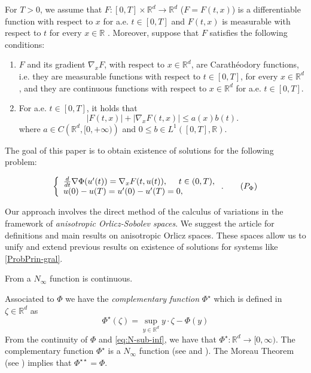 \documentclass[twoside]{article}
\makeatletter
\theoremstyle{remark}
\newcommand{\labitem}[2]{%
\def\@itemlabel{#1}
\item
\def\@currentlabel{#1}\label{#2}}
\newcommand{\rr}{\mathbb{R}}
\renewcommand{\leq}{\leqslant}
\makeatother
\begin{document}
For $T>0$, we assume that  $F:[0,T]\times\rr^d\to\rr^d$  ($F=F(t,x)$)
  is a differentiable function  with respect to $x$ for a.e. $t\in [0,T]$ and $F(t,x)$ is measurable  with respect to $t$ for every $x\in\rr$ . Moreover, suppose that $F$ satisfies the following conditions:
\begin{enumerate}
\labitem{(C)}{item:condicion_c} $F$ and its gradient $\nabla_x F$, with respect to $x\in\rr^d$,  are  Carath\'eodory functions, i.e. they are measurable functions with respect to $t\in [0,T]$, for every  $x\in\rr^d$, and they are continuous functions with  respect to  $x\in\rr^d$ for a.e. $t \in [0,T]$.
 \labitem{(A)}{item:condicion_a}  For   a.e. $t\in [0,T]$, it holds that
\begin{equation}\label{eq:phi-lagrange}
|F(t,x)| + |\nabla_x F(t,x)|  \leq a(x)b(t).
\end{equation}
where  $a\in C\left(\rr^d,[0,+\infty)\right)$ and $0\leq b\in L^1([0,T],\rr)$.
\end{enumerate}


The goal of this paper is to obtain existence of solutions for  the following problem:

\begin{equation}\label{eq:ProbPhiLapla}
    \left\{%
\begin{array}{ll}
  \frac{d}{dt} \nabla \Phi(u'(t))= \nabla_{x}F(t,u(t)), \quad \ t \in (0,T),\\
    u(0)-u(T)=u'(0)-u'(T)=0,
\end{array}%
\right. .\tag{${P_{\Phi}}$}
\end{equation}






Our approach involves the direct method of the calculus of variations in the framework of \emph{anisotropic Orlicz-Sobolev spaces}.  We suggest the article  \cite{Orliczvectorial2005} for definitions and main results on anisotropic Orlicz spaces. These spaces allow us to unify and extend previous results on existence of solutions for systems like \eqref{ProbPrin-gral}.

 From \cite[Cor. 2.35]{clarke2013functional} a $N_{\infty}$ function is  continuous.


Associated to $\Phi$ we have the \emph{complementary function} $\Phi^{\star}$ which is defined in $\zeta\in\rr^d$ as
\begin{equation}\label{eq:conjugada}
 \Phi^{\star}(\zeta)=\sup\limits_{y\in\mathbb{R}^d} y\cdot \zeta-\Phi(y)
\end{equation}
From the continuity of $\Phi$ and  \eqref{eq:N-sub-inf}, we have that $\Phi^{\star}:\rr^d \to [0,\infty)$. 
The complementary function $\Phi^{\star}$ is a  $N_{\infty}$ function (see \cite[Chapter 2]{mawhin2010critical} and \cite[Th. 2.2]{Orliczvectorial2005}).  The Moreau Theorem (see \cite[Th. 4.21]{clarke2013functional}) implies that $\Phi^{\star\star}=\Phi$.
\end{document}
